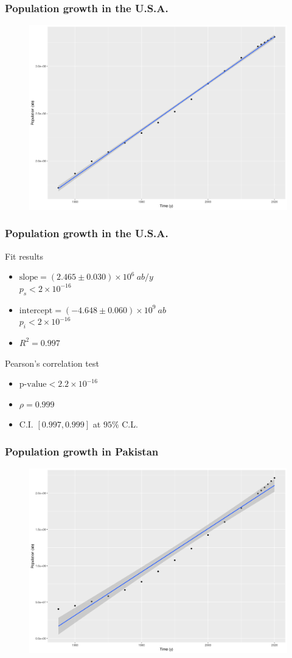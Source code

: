 \documentclass[
	11pt, %
]{beamer}
\begin{document}
\begin{frame}
	\frametitle{Population growth in the U.S.A.}
	\begin{figure}
		\includegraphics[width=.69\textwidth]{usa.png}
	\end{figure}
\end{frame}

\begin{frame}
	\frametitle{Population growth in the U.S.A.}
	\begin{exampleblock}{Fit results}
		\begin{itemize}
			\item $\text{slope} = \left(2.465 \pm 0.030\right) \times 10^6 \ ab/y$ \\
				$p_s < 2 \times 10^{-16}$
			\item $\text{intercept} = \left(-4.648 \pm 0.060\right) \times 10^9 \ ab$ \\
				$p_i < 2 \times 10^{-16}$
			\item $R^2 = 0.997$
		\end{itemize}
	\end{exampleblock}
	\begin{block}{Pearson's correlation test}
		\begin{itemize}
			\item $\text{p-value} < 2.2 \times 10^{-16}$
			\item $\rho = 0.999$
			\item C.I. $\left[0.997, 0.999\right]$ at $95\%$ C.L.
		\end{itemize}
	\end{block}
\end{frame}

\begin{frame}
	\frametitle{Population growth in Pakistan}
	\begin{figure}
		\includegraphics[width=.69\textwidth]{pak.png}
	\end{figure}
\end{frame}
\end{document}
